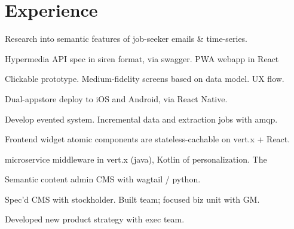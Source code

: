 \documentclass[letterpaper]{deedy-resume} %
\begin{document}
\begin{minipage}[t]{0.66\textwidth} %


\section{Experience}



\vspace{\topsep} %
\begin{tightitemize}
\item Research into semantic features of job-seeker emails \& time-series.
\item Hypermedia API spec in siren format, via swagger. PWA webapp in React
\item Clickable prototype. Medium-fidelity screens based on data model. UX flow.
\item Dual-appstore deploy to iOS and Android, via React Native.
\item Develop evented system. Incremental data and extraction jobs with amqp.
\end{tightitemize}

\sectionspace %


\begin{tightitemize}
\item Frontend widget atomic components are stateless-cachable on vert.x + React.
\item microservice middleware in vert.x (java), Kotlin of personalization. The
\item Semantic content admin CMS with wagtail / python.
\item Spec’d CMS with stockholder. Built team; focused biz unit with GM.
\item Developed new product strategy with exec team.
\end{tightitemize}


\end{minipage}
\end{document}
